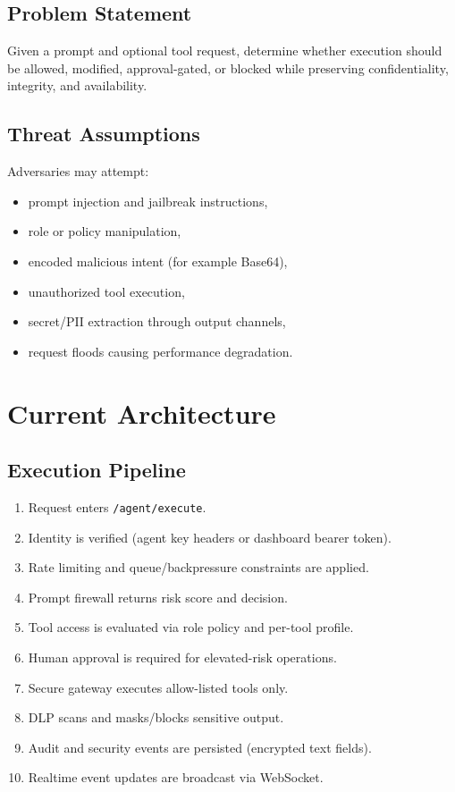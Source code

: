 \documentclass[conference]{IEEEtran}
\begin{document}
\subsection{Problem Statement}
Given a prompt and optional tool request, determine whether execution should be allowed, modified, approval-gated, or blocked while preserving confidentiality, integrity, and availability.

\subsection{Threat Assumptions}
Adversaries may attempt:
\begin{itemize}
    \item prompt injection and jailbreak instructions,
    \item role or policy manipulation,
    \item encoded malicious intent (for example Base64),
    \item unauthorized tool execution,
    \item secret/PII extraction through output channels,
    \item request floods causing performance degradation.
\end{itemize}

\section{Current Architecture}
\subsection{Execution Pipeline}
\begin{enumerate}
    \item Request enters \texttt{/agent/execute}.
    \item Identity is verified (agent key headers or dashboard bearer token).
    \item Rate limiting and queue/backpressure constraints are applied.
    \item Prompt firewall returns risk score and decision.
    \item Tool access is evaluated via role policy and per-tool profile.
    \item Human approval is required for elevated-risk operations.
    \item Secure gateway executes allow-listed tools only.
    \item DLP scans and masks/blocks sensitive output.
    \item Audit and security events are persisted (encrypted text fields).
    \item Realtime event updates are broadcast via WebSocket.
\end{enumerate}
\end{document}
